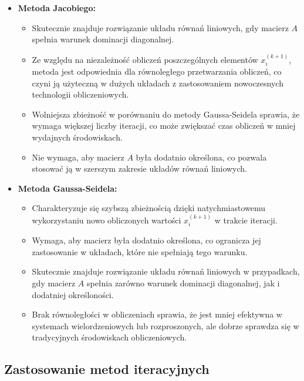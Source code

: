 \documentclass[a4paper,12pt]{article}
\begin{document}
\begin{itemize}
    \item \textbf{Metoda Jacobiego:}
    \begin{itemize}
        \item Skutecznie znajduje rozwiązanie układu równań liniowych, gdy macierz \(A\) spełnia warunek dominacji diagonalnej.
        \item Ze względu na niezależność obliczeń poszczególnych elementów \(x_i^{(k+1)}\), metoda jest odpowiednia dla równoległego przetwarzania obliczeń, co czyni ją użyteczną w dużych układach z zastosowaniem nowoczesnych technologii obliczeniowych.
        \item Wolniejsza zbieżność w porównaniu do metody Gaussa-Seidela sprawia, że wymaga większej liczby iteracji, co może zwiększać czas obliczeń w mniej wydajnych środowiskach.
        \item Nie wymaga, aby macierz \(A\) była dodatnio określona, co pozwala stosować ją w szerszym zakresie układów równań liniowych.
    \end{itemize}
    
    \item \textbf{Metoda Gaussa-Seidela:}
    \begin{itemize}
        \item Charakteryzuje się szybszą zbieżnością dzięki natychmiastowemu wykorzystaniu nowo obliczonych wartości \(x_i^{(k+1)}\) w trakcie iteracji.
        \item Wymaga, aby macierz była dodatnio określona, co ogranicza jej zastosowanie w układach, które nie spełniają tego warunku.
        \item Skutecznie znajduje rozwiązanie układu równań liniowych w przypadkach, gdy macierz \(A\) spełnia zarówno warunek dominacji diagonalnej, jak i dodatniej określoności.
        \item Brak równoległości w obliczeniach sprawia, że jest mniej efektywna w systemach wielordzeniowych lub rozproszonych, ale dobrze sprawdza się w tradycyjnych środowiskach obliczeniowych.
    \end{itemize}
\end{itemize}

\subsection{Zastosowanie metod iteracyjnych}
\end{document}
